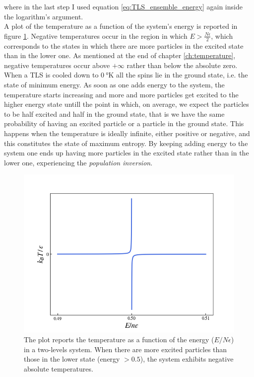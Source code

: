 where in the last step I used equation \ref{eq:TLS_ensemble_energy} again inside the logarithm's argument. \\
A plot of the temperature as a function of the system's energy is reported in figure \ref{fig:temperature_TLS}. Negative temperatures occur in the region in which $E > \frac{N\epsilon}{2}$, which corresponds to the states in which there are more particles 
in the excited state than in the lower one. As mentioned at the end of chapter \ref{ch:temperature}, negative temperatures occur above $+\infty$ rather than below the absolute zero. When a TLS is cooled down to $\SI{0}{\degree\kelvin}$ all the spins lie in the ground state, i.e. the state of minimum energy.
As soon as one adds energy to the system, the temperature starts increasing and more and more particles get excited to the higher energy state untill the point in which, on average, we expect the particles to be half excited and half in the ground state, that is we have the same probability 
of having an excited particle or a particle in the ground state. This happens when the temperature is ideally infinite, either positive or negative, and this constitutes the state of maximum entropy. By keeping adding energy to the system one ends up having more particles in the excited state rather than in the lower one,
experiencing the \emph{population inversion}. \\
\begin{figure}[h]
    \centering 
    \includegraphics[scale=0.65]{images/temperature_TLS.png}
    \caption{The plot reports the temperature as a function of the energy ($E/N\epsilon$) in a two-levels system. When there are more excited particles than those in the lower state (energy $> 0.5$), the system exhibits negative absolute temperatures.}
    \label{fig:temperature_TLS}
\end{figure}
